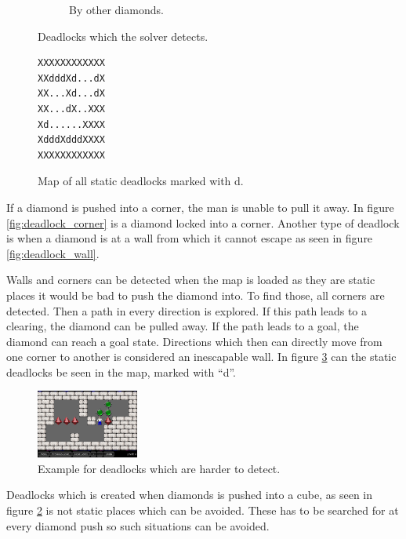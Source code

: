 \begin{figure}[h]
\begin{subfigure}{0.3\textwidth}
  \caption{By other diamonds.}
  \label{fig:deadlock_diamond}
\end{subfigure}
\caption{Deadlocks which the solver detects.}
\end{figure}

\begin{figure}
 \centering
 \begin{minipage}{0.1\textwidth}
\begin{verbatim}
XXXXXXXXXXXX
XXdddXd...dX
XX...Xd...dX
XX...dX..XXX
Xd......XXXX
XdddXdddXXXX
XXXXXXXXXXXX
\end{verbatim}
 \end{minipage}
 \caption{Map of all static deadlocks marked with d.}
 \label{fig:static_deadlocks}
\end{figure}

If a diamond is pushed into a corner, the man is unable to pull it away.
In figure \ref{fig:deadlock_corner} is a diamond locked into a corner.
Another type of deadlock is when a diamond is at a wall from which it cannot escape as seen in figure \ref{fig:deadlock_wall}.

Walls and corners can be detected when the map is loaded as they are static places it would be bad to push the diamond into.
To find those, all corners are detected.
Then a path in every direction is explored. 
If this path leads to a clearing, the diamond can be pulled away.
If the path leads to a goal, the diamond can reach a goal state.
Directions which then can directly move from one corner to another is considered an inescapable wall.
In figure \ref{fig:static_deadlocks} can the static deadlocks be seen in the map, marked with ``d''.


\begin{figure}
  \centering
  \includegraphics[width=0.3\textwidth]{img/deadlock_hard}
  \caption{Example for deadlocks which are harder to detect.}
  \label{fig:deadlock_hard}
\end{figure}

Deadlocks which is created when diamonds is pushed into a cube, as seen in figure \ref{fig:deadlock_diamond} is not static places which can be avoided.
These has to be searched for at every diamond push so such situations can be avoided.

